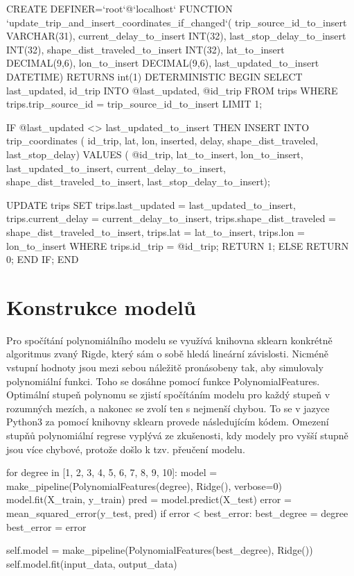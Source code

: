 \begin{code}[frame=none]
CREATE DEFINER=`root`@`localhost` FUNCTION
  `update_trip_and_insert_coordinates_if_changed`(
  trip_source_id_to_insert VARCHAR(31),
  current_delay_to_insert INT(32),
    last_stop_delay_to_insert INT(32),
  shape_dist_traveled_to_insert INT(32),
  lat_to_insert DECIMAL(9,6),
  lon_to_insert DECIMAL(9,6),
  last_updated_to_insert DATETIME) RETURNS int(1)
    DETERMINISTIC
BEGIN
  SELECT last_updated, id_trip
  INTO @last_updated, @id_trip
  FROM trips
  WHERE trips.trip_source_id = trip_source_id_to_insert
  LIMIT 1;


  IF @last_updated <> last_updated_to_insert THEN
    INSERT INTO trip_coordinates (
      id_trip,
      lat,
      lon,
      inserted,
      delay,
      shape_dist_traveled,
      last_stop_delay)
    VALUES (
      @id_trip,
      lat_to_insert,
      lon_to_insert,
      last_updated_to_insert,
      current_delay_to_insert,
      shape_dist_traveled_to_insert,
      last_stop_delay_to_insert);


    UPDATE trips
    SET trips.last_updated = last_updated_to_insert,
      trips.current_delay = current_delay_to_insert,
      trips.shape_dist_traveled = shape_dist_traveled_to_insert,
      trips.lat = lat_to_insert,
      trips.lon = lon_to_insert
    WHERE trips.id_trip = @id_trip;
        RETURN 1;
  ELSE
    RETURN 0;
  END IF;
END
\end{code}




\section{Konstrukce modelů} \label{section:konstrukce_modelu}


Pro spočítání polynomiálního modelu se využívá knihovna sklearn konkrétně algoritmus zvaný Rigde, který sám o sobě hledá lineární závislosti. Nicméně vstupní hodnoty jsou mezi sebou náležitě pronásobeny tak, aby simulovaly polynomiální funkci. Toho se dosáhne pomocí funkce PolynomialFeatures. Optimální stupeň polynomu se zjistí spočítáním modelu pro každý stupeň v rozumných mezích, a nakonec se zvolí ten s nejmenší chybou. To se v jazyce Python3 za pomocí knihovny sklearn provede následujícím kódem. Omezení stupňů polynomiální regrese vyplývá ze zkušenosti, kdy modely pro vyšší stupně jsou více chybové, protože došlo k tzv. přeučení modelu.


\begin{code}[frame=none]
for degree in [1, 2, 3, 4, 5, 6, 7, 8, 9, 10]:
  model = make_pipeline(PolynomialFeatures(degree), Ridge(), verbose=0)
  model.fit(X_train, y_train)
  pred = model.predict(X_test)
  error = mean_squared_error(y_test, pred)
  if error < best_error:
    best_degree = degree
    best_error = error


self.model = make_pipeline(PolynomialFeatures(best_degree), Ridge())
self.model.fit(input_data, output_data)
\end{code}


